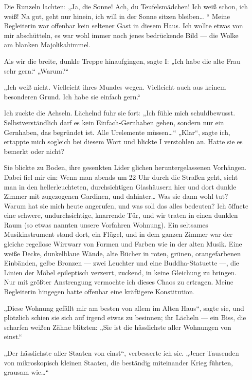 Die Runzeln lachten: „Ja, die Sonne! Ach, du Teufelsmädchen! Ich
weiß schon, ich weiß! Na gut, geht nur hinein, ich will in der
Sonne sitzen bleiben\ldots{} “ Meine Begleiterin war offenbar kein
seltener Gast in diesem Haus. Ich wollte etwas von mir abschütteln,
es war wohl immer noch jenes bedrückende Bild — die Wolke am
blanken Majolikahimmel.

Als wir die breite, dunkle Treppe hinaufgingen, sagte I: „Ich habe
die alte Frau sehr gern.“ „Warum?“

„Ich weiß nicht. Vielleicht ihres Mundes wegen. Vielleicht auch aus
keinem besonderen Grund. Ich habe sie einfach gern.“

Ich zuckte die Achseln. Lächelnd fuhr sie fort: „Ich fühle mich
schuldbewusst. Selbstverständlich darf es kein
\glq{}Einfach-Gern\-ha\-ben\grq{} geben, sondern nur ein
Gernhaben, das begründet ist. Alle Urelemente müssen\ldots{}“ „Klar“,
sagte ich, ertappte mich sogleich bei diesem Wort und blickte I
verstohlen an. Hatte sie es bemerkt oder nicht?

Sie blickte zu Boden, ihre gesenkten Lider glichen
heruntergelassenen Vorhängen. Dabei fiel mir ein: Wenn man abends
um 22 Uhr durch die Straßen geht, sieht man in den
hellerleuchteten, durchsichtigen Glashäusern hier und dort dunkle
Zimmer mit zugezogenen Gardinen, und dahinter\ldots{} Was sie dann wohl
tut? Warum hat sie mich heute angerufen, und was soll das alles
bedeuten? Ich öffnete eine schwere, undurchsichtige, knarrende Tür,
und wir traten in einen dunklen Raum (so etwas nannten
unsere Vorfahren Wohnung). Ein seltsames Musikinstrument stand
dort, ein Flügel, und in dem ganzen Zimmer war der gleiche
regellose Wirrwarr von Formen und Farben wie in der alten Musik.
Eine weiße Decke, dunkelblaue Wände, alte Bücher in roten, grünen,
orangefarbenen Einbänden, gelbe Bronzen — zwei Leuchter und eine
Buddha-Statuette —, die Linien der Möbel epileptisch verzerrt,
zuckend, in keine Gleichung zu bringen. Nur mit größter Anstrengung
vermochte ich dieses Chaos zu ertragen. Meine Begleiterin hingegen
hatte offenbar eine kräftigere Konstitution.

„Diese Wohnung gefällt mir am besten von allem im Alten Haus“,
sagte sie, und plötzlich schien sie sich auf irgend etwas zu
besinnen; ihr Lächeln — ein Biss, die scharfen weißen Zähne
blitzten: „Sie ist die hässlichste aller Wohnungen von einst.“

„Der hässlichste aller Staaten von einst“, verbesserte ich sie.
„Jener Tausenden von mikroskopisch kleinen Staaten, die beständig
miteinander Krieg führten, grausam wie\ldots{}“

